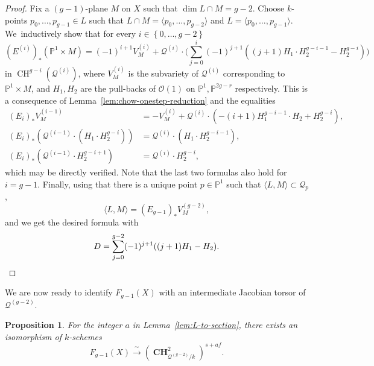 \documentclass[JEP,XML,SOM,Unicode,NoEqCountersInSection,published]{cedram}
\let\cal\mathcal
\theoremstyle{plain}
\newtheorem{prop}[thm]{Proposition}
\theoremstyle{definition}
\DeclareMathOperator{\CH}{CH}
\DeclareMathOperator{\bCH}{\mathbf{CH}}
\renewcommand\P{\mathbb{P}}
\renewcommand\O{\mathcal{O}}
\begin{document}
\begin{proof}
Fix a $(g-1)$-plane $M$ on $X$ such that $\dim L\cap M=g-2$.
Choose $k$\nobreakdash-points $p_0,\dots, p_{g-1}\in L$ such that $L\cap M=\langle p_0,\dots, p_{g-2}\rangle$ and $L=\langle p_0,\dots, p_{g-1}\rangle$. We~inductively show that
for every $i\in\left\{0,\dots, g-2\right\}$
\[
(E^{(i)})_*(\P^1\times M)=(-1)^{i+1}V^{(i)}_M + \mathcal{Q}^{(i)}\cdot \biggl(\sum_{j=0}^i(-1)^{j+1}((j+1)H_1\cdot H_2^{g-i-1}-H_2^{g-i})\biggr)
\]
in $\CH^{g-i}(\mathcal{Q}^{(i)})$,
where $V^{(i)}_M$ is the subvariety of $\mathcal{Q}^{(i)}$ corresponding to $\P^1\times M$, and $H_1, H_2$ are the pull-backs of $\O(1)$ on $\P^1, \P^{2g-r}$ respectively.
This is a consequence of Lemma~\ref{lem:chow-onestep-reduction} and the equalities
\begin{align*}
(E_i)_*V_M^{(i-1)}&= - V_M^{(i)} + \mathcal{Q}^{(i)}\cdot(-(i+1)H_1^{g-i-1}\cdot H_2 + H_2^{g-i}),\\
(E_i)_*(\mathcal{Q}^{(i-1)}\cdot (H_1\cdot H_2^{g-i}))&=\mathcal{Q}^{(i)}\cdot (H_1\cdot H_2^{g-i-1}),\\
(E_i)_*(\mathcal{Q}^{(i-1)}\cdot H_2^{g-i+1})&=\mathcal{Q}^{(i)}\cdot H_2^{g-i},
\end{align*}
which may be directly verified.
Note that the last two formulas also hold for $i=g-1$.
Finally, using that there is a unique point $p\in \P^1$ such that $\langle L, M\rangle \subset \mathcal{Q}_p$,
\[
\langle L, M\rangle = (E_{g-1})_*V_M^{(g-2)},
\]
and we get the desired formula with
\[
D=\sum_{j=0}^{g-2}(-1)^{j+1}((j+1)H_1-H_2).\qedhere
\]
\end{proof}

We are now ready to identify \(F_{g-1}(X)\) with an intermediate Jacobian torsor of \(\cal Q^{(g-2)}\).
\begin{prop}\label{prop-fanoch2s}
For the integer \(a\) in Lemma~\ref{lem:L-to-section},
there exists an isomorphism of
$k$\nobreakdash-schemes
\[
F_{g-1}(X)\xrightarrow{\;\sim\;}(\bCH^2_{\mathcal{Q}^{(g-2)}/k})^{s+af}.
\]
\end{prop}
\end{document}
